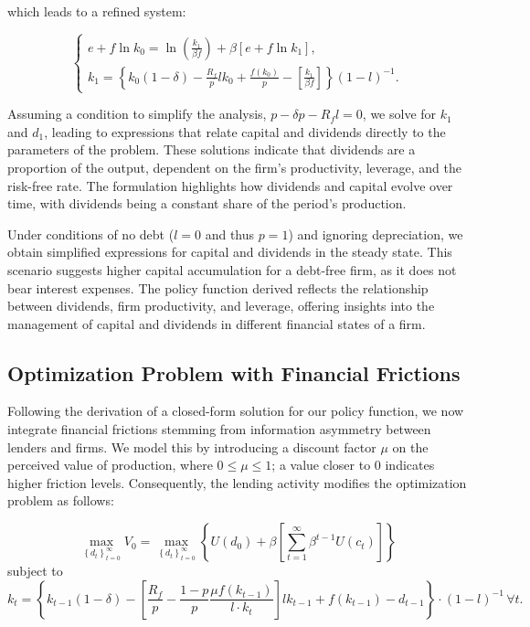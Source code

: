 \documentclass[12pt]{article}
\begin{document}
which leads to a refined system:


\begin{equation}
    \begin{cases}
        e + f \ln{k_0} = \ln{\left(\frac{k_1}{\beta f}\right)} + \beta [e + f \ln{k_1}], \\
        k_1 = \left\{k_0(1 - \delta) - \frac{R_f}{p} l k_0 + \frac{f(k_0)}{p} - \left[ \frac{k_1}{\beta f}\right] \right\}{(1-l)}^{-1}.
    \end{cases}
\end{equation}


Assuming a condition to simplify the analysis, \(p - \delta p - R_f l=0\), we solve for \(k_1\) and \(d_1\), leading to
expressions that relate capital and dividends directly to the parameters of the problem. These solutions indicate that
dividends are a proportion of the output, dependent on the firm's productivity, leverage, and the risk-free rate. The
formulation highlights how dividends and capital evolve over time,  with dividends being a constant share of the
period's production.

Under conditions of no debt (\(l=0\) and thus \(p=1\)) and ignoring depreciation, we obtain simplified expressions for
capital and dividends in the steady state. This scenario suggests higher capital accumulation for a debt-free firm, as
it does not bear interest expenses. The policy function derived reflects the relationship between dividends, firm
productivity, and leverage, offering insights into the management of capital  and dividends in different financial
states of a firm.

\subsection{Optimization Problem with Financial Frictions}

Following the derivation of a closed-form solution for our policy function, we now integrate financial frictions
stemming from information  asymmetry between lenders and firms. We model this by introducing a discount factor \(\mu\)
on the perceived value of production, where \(0 \leq \mu \leq 1\); a value closer to 0 indicates higher friction levels.
Consequently, the lending activity modifies the optimization problem as follows:

\begin{equation}
    \max _{\left\{d_t\right\}_{t=0}^{\infty}} V_0 = \max _{\left\{d_t\right\}_{t=0}^{\infty}} \left\{ U(d_0) + \beta \left[ \sum_{t=1}^{\infty} \beta^{t-1} U(c_t) \right] \right\}
\end{equation}
subject to
\begin{equation}
    k_t = \left\{ k_{t-1}(1 - \delta) - \left[ \frac{R_f}{p} - \frac{1-p}{p} \frac{\mu f(k_{t-1})}{l \cdot k_t} \right] l k_{t-1} + f(k_{t-1}) - d_{t-1} \right\} \cdot \left(1-l\right)^{-1} \, \forall t.
\end{equation}
\end{document}
